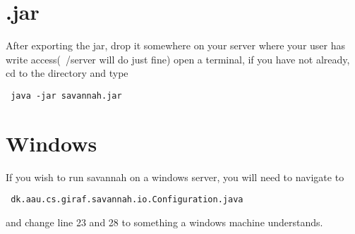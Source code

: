 \part*{.jar}
After exporting the jar, drop it somewhere on your server where your user has write access(~/server will do just fine)
open a terminal, if you have not already, cd to the directory and type
\begin{verbatim}
 java -jar savannah.jar
\end{verbatim}

\part*{Windows}
\label{windows}
If you wish to run savannah on a windows server, you will need to navigate	 to 
\begin{verbatim}
 dk.aau.cs.giraf.savannah.io.Configuration.java
\end{verbatim}
and change line 23 and 28 to something a windows machine understands.


